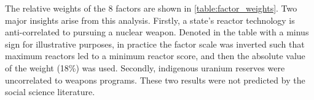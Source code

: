 The relative weights of the 8 factors are shown in \ref{table:factor_weights}.  Two major insights arise from this analysis. Firstly, a state's reactor technology is anti-correlated to pursuing a nuclear weapon.  Denoted in the table with a minus sign for illustrative purposes, in practice the factor scale was inverted such that maximum reactors led to a minimum reactor score, and then the absolute value of the weight (18\%) was used.  Secondly, indigenous uranium reserves were uncorrelated to weapons programs. These two results were not predicted by the social science literature.



\iffalse
\begin{figure}%
\begin{center}
\texttt{[image: ./figs/signatures\_table.pdf]}
\end{center}
\caption{Table of potential signatures across the fuel cycle: measureable through open, independent sources such as satellite imagery (green), available through official inspections (blue), or potentially unreliable due to physical or political constraints (yellow)\cite{kemp_environmental_2016,_plutonium_????,ferreira_radiometric_2012,stork_systematic_2006}.}
\label{fig:signatures}
\end{figure}
\fi

